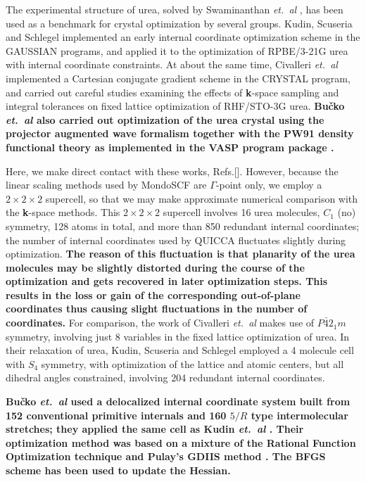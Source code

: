 \twolinestyle{\documentclass[prb,preprint]{revtex4}}
\begin{document}
The experimental structure of urea, solved by Swaminanthan {\em et.~al} \cite{SSwaminathan84},
has been used as a benchmark for crystal optimization by several groups.  
Kudin, Scuseria and Schlegel \cite{KKudin01} implemented an early internal coordinate 
optimization scheme in the GAUSSIAN programs, and applied it to the optimization of
RPBE/3-21G urea with internal coordinate constraints.  At about the same time,  
Civalleri {\em et.~al} \cite{BCivalleri01} implemented a Cartesian conjugate gradient 
scheme in the CRYSTAL program, and carried out careful studies examining the effects of 
{\bf k}-space sampling and integral tolerances on fixed lattice optimization of RHF/STO-3G urea.
{\bf
Bu\v{c}ko {\em et.~al} \cite{TBucko05} also carried out optimization of the
urea crystal using the projector augmented wave formalism together with the PW91
density functional theory as implemented in the VASP program package \cite{GKresse96}. 
}

Here, we make direct contact with these works, Refs.[].
However, because the linear scaling methods used by {\sc MondoSCF} are $\Gamma$-point only, 
we employ a $2\times2\times2$ supercell, so that we may make approximate numerical 
comparison with the {\bf k}-space methods.  This $2\times2\times2$ supercell involves 
16 urea molecules, $C_1$ (no) symmetry, 128 atoms in total, and more than 850 redundant internal 
coordinates;  the number of internal coordinates used by QUICCA fluctuates slightly during optimization.  
{\bf
The reason of this fluctuation is that planarity of the urea molecules
may be slightly distorted during the course of the optimization and gets 
recovered in later optimization steps. This results
in the loss or gain of the corresponding out-of-plane coordinates thus
causing slight fluctuations in the number of coordinates.
}
For comparison, the work of Civalleri {\em et.~al} \cite{BCivalleri01} makes use of $P\bar{4}2_1m$ 
symmetry, involving just 8 variables in the fixed lattice optimization of urea.  In their 
relaxation of urea, Kudin, Scuseria and Schlegel \cite{KKudin01} 
employed a 4 molecule cell with $S_4$ symmetry, with optimization of the lattice and 
atomic centers, but all dihedral angles constrained, involving 204 redundant internal 
coordinates.

{\bf
Bu\v{c}ko {\em et.~al} \cite{TBucko05} used a delocalized internal coordinate system built
from 152 conventional primitive internals and 160 $5/R$ type intermolecular
stretches; they applied the same cell as Kudin {\em et.~al} \cite{KKudin01}.
Their optimization method was based on a mixture of the Rational Function 
Optimization technique and Pulay's GDIIS method \cite{FEckert97}. 
The BFGS scheme \cite{RFletcher81} has been used to update the Hessian.
}
\end{document}
